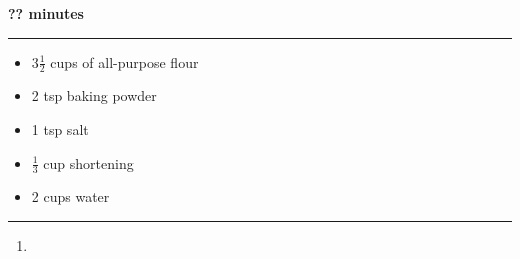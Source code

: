  \hfill {\large \textbf{?? minutes}}

\vspace{15pt} \hrule \vspace{15pt}
\begin{itemize}
	\item 3$\frac{1}{2}$ cups of all-purpose flour
	\item 2 tsp baking powder
	\item 1 tsp salt
	\item $\frac{1}{3}$ cup shortening
	\item 2 cups water
\end{itemize}

\vspace{15pt} \hrule \vspace{15pt}
\begin{enumerate}
	\item
\end{enumerate}
